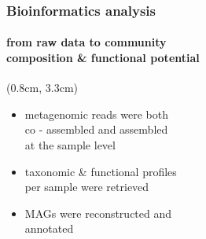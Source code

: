 \documentclass{beamer}
\begin{document}
   \begin{frame}
      \frametitle{Bioinformatics analysis}
      \framesubtitle{from raw data to community \\ composition \& functional potential}


      \begin{textblock*}{6cm}(0.8cm, 3.3cm)
         \small 

         \begin{itemize}

            \item metagenomic reads were both \\
            co - assembled and assembled \\
            at the sample level 
            \item taxonomic \& functional profiles \\
            per sample were retrieved \\ 
            \item MAGs were reconstructed and \\
            annotated

         \end{itemize}



      \end{textblock*}
   \end{frame}
\end{document}
